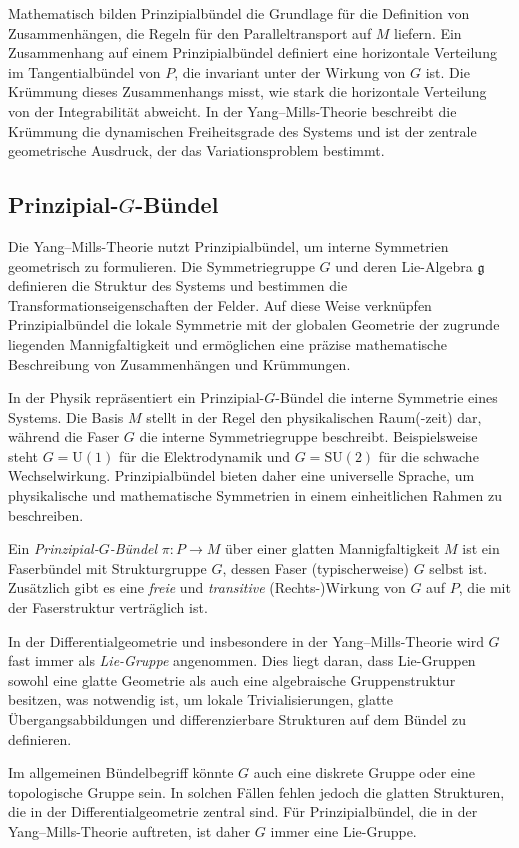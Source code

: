 \documentclass[10pt, letterpaper]{article}
\begin{document}
Mathematisch bilden Prinzipialbündel die Grundlage für die Definition von Zusammenhängen, die Regeln für den Paralleltransport auf \(M\) liefern. Ein Zusammenhang auf einem Prinzipialbündel definiert eine horizontale Verteilung im Tangentialbündel von \(P\), die invariant unter der Wirkung von \(G\) ist. Die Krümmung dieses Zusammenhangs misst, wie stark die horizontale Verteilung von der Integrabilität abweicht. In der Yang--Mills-Theorie beschreibt die Krümmung die dynamischen Freiheitsgrade des Systems und ist der zentrale geometrische Ausdruck, der das Variationsproblem bestimmt.

\subsection{Prinzipial-\(G\)-Bündel}


Die Yang--Mills-Theorie nutzt Prinzipialbündel, um interne Symmetrien geometrisch zu formulieren. Die Symmetriegruppe \(G\) und deren Lie-Algebra \(\mathfrak{g}\) definieren die Struktur des Systems und bestimmen die Transformationseigenschaften der Felder. Auf diese Weise verknüpfen Prinzipialbündel die lokale Symmetrie mit der globalen Geometrie der zugrunde liegenden Mannigfaltigkeit und ermöglichen eine präzise mathematische Beschreibung von Zusammenhängen und Krümmungen.

In der Physik repräsentiert ein Prinzipial-\(G\)-Bündel die interne Symmetrie eines Systems. Die Basis \(M\) stellt in der Regel den physikalischen Raum(-zeit) dar, während die Faser \(G\) die interne Symmetriegruppe beschreibt. Beispielsweise steht \(G = \mathrm{U}(1)\) für die Elektrodynamik und \(G = \mathrm{SU}(2)\) für die schwache Wechselwirkung. Prinzipialbündel bieten daher eine universelle Sprache, um physikalische und mathematische Symmetrien in einem einheitlichen Rahmen zu beschreiben.


\begin{definition}
Ein \emph{Prinzipial-\(G\)-Bündel} \(\pi: P \to M\) über einer glatten Mannigfaltigkeit \(M\) ist ein Faserbündel mit Strukturgruppe \(G\), dessen Faser (typischerweise) \(G\) selbst ist. Zusätzlich gibt es eine \emph{freie} und \emph{transitive} (Rechts-)Wirkung von \(G\) auf \(P\), die mit der Faserstruktur verträglich ist.
\end{definition}

\begin{remark}
In der Differentialgeometrie und insbesondere in der Yang--Mills-Theorie wird \(G\) fast immer als \emph{Lie-Gruppe} angenommen. Dies liegt daran, dass Lie-Gruppen sowohl eine glatte Geometrie als auch eine algebraische Gruppenstruktur besitzen, was notwendig ist, um lokale Trivialisierungen, glatte Übergangsabbildungen und differenzierbare Strukturen auf dem Bündel zu definieren.  

Im allgemeinen Bündelbegriff könnte \(G\) auch eine diskrete Gruppe oder eine topologische Gruppe sein. In solchen Fällen fehlen jedoch die glatten Strukturen, die in der Differentialgeometrie zentral sind. Für Prinzipialbündel, die in der Yang--Mills-Theorie auftreten, ist daher \(G\) immer eine Lie-Gruppe.
\end{remark}
\end{document}
